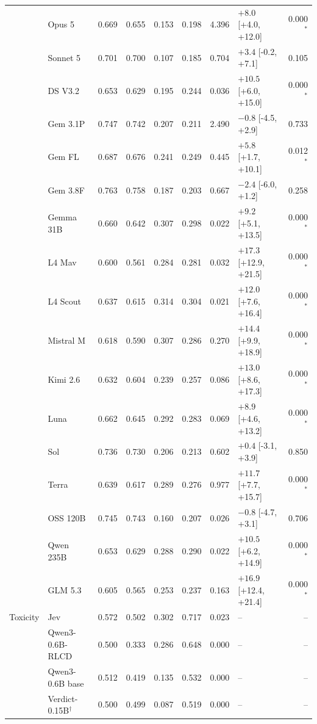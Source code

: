 \begin{longtable}{llrrrrrlr}
 & Opus 5 & 0.669 & 0.655 & 0.153 & 0.198 & 4.396 & $+8.0$ [+4.0, +12.0] & 0.000$^{*}$ \\
 & Sonnet 5 & 0.701 & 0.700 & 0.107 & 0.185 & 0.704 & $+3.4$ [-0.2, +7.1] & 0.105 \\
 & DS V3.2 & 0.653 & 0.629 & 0.195 & 0.244 & 0.036 & $+10.5$ [+6.0, +15.0] & 0.000$^{*}$ \\
 & Gem 3.1P & 0.747 & 0.742 & 0.207 & 0.211 & 2.490 & $-0.8$ [-4.5, +2.9] & 0.733 \\
 & Gem FL & 0.687 & 0.676 & 0.241 & 0.249 & 0.445 & $+5.8$ [+1.7, +10.1] & 0.012$^{*}$ \\
 & Gem 3.8F & 0.763 & 0.758 & 0.187 & 0.203 & 0.667 & $-2.4$ [-6.0, +1.2] & 0.258 \\
 & Gemma 31B & 0.660 & 0.642 & 0.307 & 0.298 & 0.022 & $+9.2$ [+5.1, +13.5] & 0.000$^{*}$ \\
 & L4 Mav & 0.600 & 0.561 & 0.284 & 0.281 & 0.032 & $+17.3$ [+12.9, +21.5] & 0.000$^{*}$ \\
 & L4 Scout & 0.637 & 0.615 & 0.314 & 0.304 & 0.021 & $+12.0$ [+7.6, +16.4] & 0.000$^{*}$ \\
 & Mistral M & 0.618 & 0.590 & 0.307 & 0.286 & 0.270 & $+14.4$ [+9.9, +18.9] & 0.000$^{*}$ \\
 & Kimi 2.6 & 0.632 & 0.604 & 0.239 & 0.257 & 0.086 & $+13.0$ [+8.6, +17.3] & 0.000$^{*}$ \\
 & Luna & 0.662 & 0.645 & 0.292 & 0.283 & 0.069 & $+8.9$ [+4.6, +13.2] & 0.000$^{*}$ \\
 & Sol & 0.736 & 0.730 & 0.206 & 0.213 & 0.602 & $+0.4$ [-3.1, +3.9] & 0.850 \\
 & Terra & 0.639 & 0.617 & 0.289 & 0.276 & 0.977 & $+11.7$ [+7.7, +15.7] & 0.000$^{*}$ \\
 & OSS 120B & 0.745 & 0.743 & 0.160 & 0.207 & 0.026 & $-0.8$ [-4.7, +3.1] & 0.706 \\
 & Qwen 235B & 0.653 & 0.629 & 0.288 & 0.290 & 0.022 & $+10.5$ [+6.2, +14.9] & 0.000$^{*}$ \\
 & GLM 5.3 & 0.605 & 0.565 & 0.253 & 0.237 & 0.163 & $+16.9$ [+12.4, +21.4] & 0.000$^{*}$ \\
\midrule
Toxicity & Jev & 0.572 & 0.502 & 0.302 & 0.717 & 0.023 & -- & -- \\
 & Qwen3-0.6B-RLCD & 0.500 & 0.333 & 0.286 & 0.648 & 0.000 & -- & -- \\
 & Qwen3-0.6B base & 0.512 & 0.419 & 0.135 & 0.532 & 0.000 & -- & -- \\
 & Verdict-0.15B$^{\dagger}$ & 0.500 & 0.499 & 0.087 & 0.519 & 0.000 & -- & -- \\

\end{longtable}
